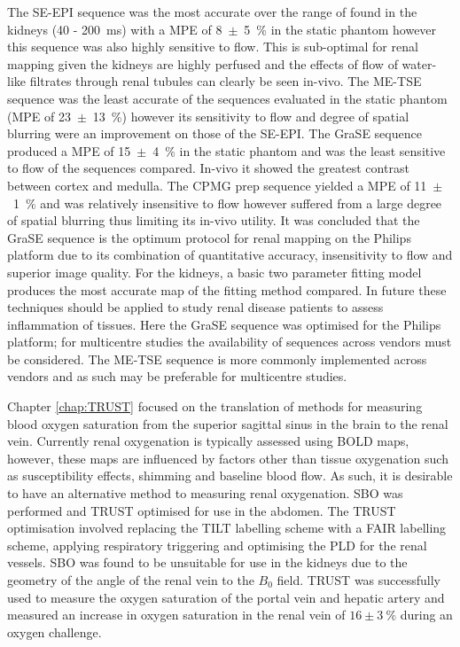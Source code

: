 The \ac{SE}-\ac{EPI} sequence was the most accurate over the range of \ttwo found in the kidneys (40 - 200~ms) with a \ac{MPE} of 8~$\pm$~5~\% in the static phantom however this sequence was also highly sensitive to flow. This is sub-optimal for renal \ttwo mapping given the kidneys are highly perfused and the effects of flow of water-like filtrates through renal tubules can clearly be seen in-vivo. The \ac{ME-TSE} sequence was the least accurate of the sequences evaluated in the static phantom (\ac{MPE} of 23~$\pm$~13~\%) however its sensitivity to flow and degree of spatial blurring were an improvement on those of the \ac{SE}-\ac{EPI}. The \ac{GraSE} sequence produced a \ac{MPE} of 15~$\pm$~4~\% in the static phantom and was the least sensitive to flow of the sequences compared. In-vivo it showed the greatest contrast between cortex and medulla. The \ac{CPMG} \ttwo prep sequence yielded a \ac{MPE} of 11~$\pm$~1~\% and was relatively insensitive to flow however suffered from a large degree of spatial blurring thus limiting its in-vivo utility. It was concluded that the \ac{GraSE} sequence is the optimum protocol for renal \ttwo mapping on the Philips platform due to its combination of quantitative accuracy, insensitivity to flow and superior image quality. For the kidneys, a basic two parameter fitting model produces the most accurate \ttwo map of the fitting method compared. In future these techniques should be applied to study renal disease patients to assess inflammation of tissues. Here the \ac{GraSE} sequence was optimised for the Philips platform; for multicentre studies the availability of sequences across vendors must be considered. The \ac{ME-TSE} sequence is more commonly implemented across vendors and as such may be preferable for multicentre studies.

Chapter \ref{chap:TRUST} focused on the translation of methods for measuring blood oxygen saturation from the superior sagittal sinus in the brain to the renal vein. Currently renal oxygenation is typically assessed using \ac{BOLD} \ttwostar maps, however, these maps are influenced by factors other than tissue oxygenation such as susceptibility effects, shimming and baseline blood flow. As such, it is desirable to have an alternative method to measuring renal oxygenation. \ac{SBO} was performed and \ac{TRUST} optimised for use in the abdomen. The \ac{TRUST} optimisation involved replacing the \ac{TILT} labelling scheme with a \ac{FAIR} labelling scheme, applying respiratory triggering and optimising the \ac{PLD} for the renal vessels. \ac{SBO} was found to be unsuitable for use in the kidneys due to the geometry of the angle of the renal vein to the $B_0$ field. \ac{TRUST} was successfully used to measure the oxygen saturation of the portal vein and hepatic artery and measured an increase in oxygen saturation in the renal vein of $16 \pm 3~\%$ during an oxygen challenge.


